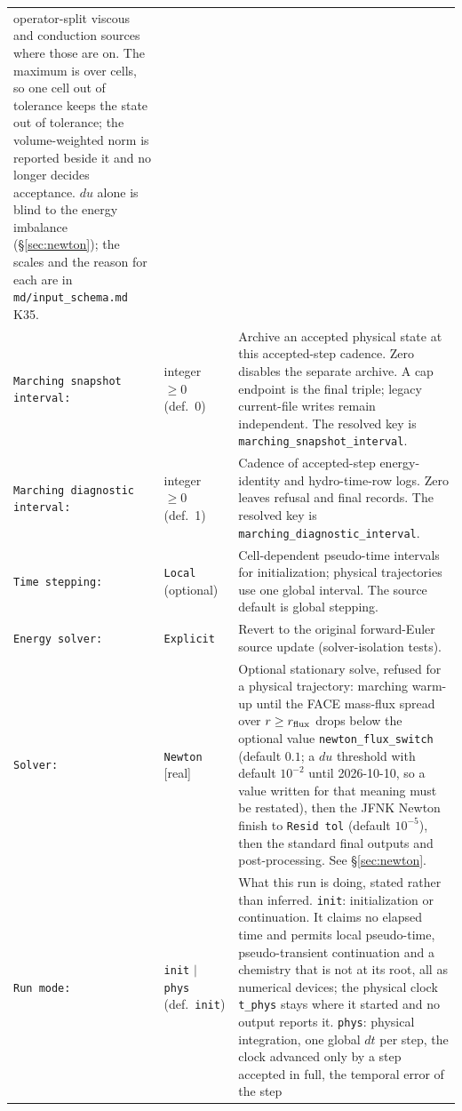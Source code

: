 \documentclass[english,a4paper]{my_memo}
\begin{document}
\begin{longtable}{@{}p{}p{}p{}@{}}
  operator-split viscous and conduction sources where those are on. The
  maximum is over cells, so one cell out of tolerance keeps the state out of
  tolerance; the volume-weighted norm is reported beside it and no longer
  decides acceptance. $du$ alone is blind to the energy imbalance
  (\S\ref{sec:newton}); the scales and the reason for each are in
  \texttt{md/input\_schema.md} K35. \\
\texttt{Marching snapshot interval:} & integer $\geq0$ (def.\ 0)
  & Archive an accepted physical state at this accepted-step cadence.
  Zero disables the separate archive. A cap endpoint is the final triple;
  legacy current-file writes remain independent. The resolved key is
  \texttt{marching\_snapshot\_interval}. \\
\texttt{Marching diagnostic interval:} & integer $\geq0$ (def.\ 1)
  & Cadence of accepted-step energy-identity and hydro-time-row logs.
  Zero leaves refusal and final records. The resolved key is
  \texttt{marching\_diagnostic\_interval}. \\
\texttt{Time stepping:} & \texttt{Local} (optional) & Cell-dependent
  pseudo-time intervals for initialization; physical trajectories use one
  global interval. The source default is global stepping. \\
\texttt{Energy solver:} & \texttt{Explicit} & Revert to the original
  forward-Euler source update (solver-isolation tests). \\
\texttt{Solver:} & \texttt{Newton} [real] & Optional stationary solve,
  refused for a physical trajectory:
  marching warm-up until the FACE mass-flux spread over $r\ge r_{\rm flux}$
  drops below the optional value \texttt{newton\_flux\_switch} (default
  $0.1$; a $du$ threshold with default $10^{-2}$ until 2026-10-10, so a value
  written for that meaning must be restated), then the JFNK Newton finish to
  \texttt{Resid tol} (default $10^{-5}$), then the standard final outputs and
  post-processing. See \S\ref{sec:newton}. \\
\texttt{Run mode:} & \texttt{init} $|$ \texttt{phys} (def.\ \texttt{init})
  & What this run is doing, stated rather than inferred.
  \texttt{init}: initialization or continuation. It claims no elapsed time
  and permits local pseudo-time, pseudo-transient continuation and a
  chemistry that is not at its root, all as numerical devices; the physical
  clock \texttt{t\_phys} stays where it started and no output reports it.
  \texttt{phys}: physical integration, one global $dt$ per step, the clock
  advanced only by a step accepted in full, the temporal error of the step

\end{longtable}
\end{document}
